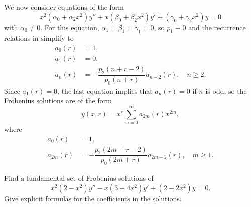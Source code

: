 We now consider equations of the form
\begin{equation} \label{eq:7.5.23}
x^2(\alpha_0+\alpha_2x^2)y''+x(\beta_0+\beta_2x^2)y'+
(\gamma_0+\gamma_2x^2)y=0
\end{equation}
with $\alpha_0\ne0$. For this equation,
$\alpha_1=\beta_1=\gamma_1=0$, so $p_1\equiv0$ and the recurrence
relations in  simplify to
\begin{align*}
a_0(r)&=1,\\
a_1(r)&=0,\\
a_n(r)&=-\dfrac{p_2(n+r-2)}{p_0(n+r)}a_{n-2}(r),\quad n\ge2.
\end{align*}
Since $a_1(r)=0$, the last equation implies that $a_n(r)=0$ if $n$ is
odd, so the Frobenius solutions are of the form
\[
y(x,r)=x^r\sum_{m=0}^\infty a_{2m}(r)x^{2m},
\]
where
\begin{equation} \label{eq:7.5.24}
\begin{aligned}
a_0(r)&=1,\\
a_{2m}(r)&=-\dfrac{p_2(2m+r-2)}{p_0(2m+r)}a_{2m-2}(r),\quad m\ge1.
\end{aligned}
\end{equation}

\begin{example}\label{example:7.5.3}
Find a fundamental set of   Frobenius solutions of
\begin{equation} \label{eq:7.5.25}
x^2(2-x^2)y''-x(3+4x^2)y'+(2-2x^2)y=0.
\end{equation}
Give explicit  formulas for the coefficients in the solutions.
\end{example}


